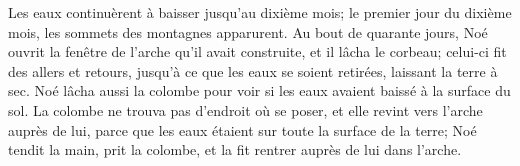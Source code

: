 Les eaux continuèrent à baisser jusqu’au dixième mois;
	le premier jour du dixième mois, les sommets des montagnes apparurent.
Au bout de quarante jours,
	Noé ouvrit la fenêtre de l’arche qu’il avait construite,
	et il lâcha le corbeau; celui-ci fit des allers et retours,
	jusqu’à ce que les eaux se soient retirées, laissant la terre à sec.
Noé lâcha aussi la colombe
	pour voir si les eaux avaient baissé à la surface du sol.
La colombe ne trouva pas d’endroit où se poser,
	et elle revint vers l’arche auprès de lui,
	parce que les eaux étaient sur toute la surface de la terre;
	Noé tendit la main, prit la colombe,
	et la fit rentrer auprès de lui dans l’arche.
